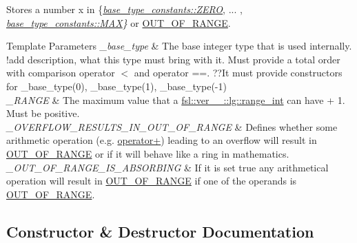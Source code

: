 Stores a number x in \{{\itshape \mbox{\hyperlink{structfsl_1_1ver__1__0_1_1lg_1_1range__int_1_1base__type__constants_ada13cd01546095bb61095888cd0ab41d}{base\+\_\+type\+\_\+constants\+::\+Z\+E\+RO}}}, ... , {\itshape \mbox{\hyperlink{structfsl_1_1ver__1__0_1_1lg_1_1range__int_1_1base__type__constants_ae6291d70cbe40dbc429eba9cc4db9d27}{base\+\_\+type\+\_\+constants\+::\+M\+AX}}\}} or \mbox{\hyperlink{classfsl_1_1ver__1__0_1_1lg_1_1range__int_a4262605b56b8b319c33b0d1ccb190a82}{O\+U\+T\+\_\+\+O\+F\+\_\+\+R\+A\+N\+GE}}. 
\begin{DoxyTemplParams}{Template Parameters}
{\em \+\_\+base\+\_\+type} & The base integer type that is used internally. !add description, what this type must bring with it. Must provide a total order with comparison operator $<$ and operator ==. ??It must provide constructors for \+\_\+base\+\_\+type(0), \+\_\+base\+\_\+type(1), \+\_\+base\+\_\+type(-\/1) \\
\hline
{\em \+\_\+\+R\+A\+N\+GE} & The maximum value that a \mbox{\hyperlink{classfsl_1_1ver__1__0_1_1lg_1_1range__int}{fsl\+::ver\+\_\+\_\+::lg\+::range\+\_\+int}} can have + 1. Must be positive. \\
\hline
{\em \+\_\+\+O\+V\+E\+R\+F\+L\+O\+W\+\_\+\+R\+E\+S\+U\+L\+T\+S\+\_\+\+I\+N\+\_\+\+O\+U\+T\+\_\+\+O\+F\+\_\+\+R\+A\+N\+GE} & Defines whether some arithmetic operation (e.\+g. \mbox{\hyperlink{classfsl_1_1ver__1__0_1_1lg_1_1range__int_a6ca845f4b8e8805cba8037d1fd9c4200}{operator+}}) leading to an overflow will result in \mbox{\hyperlink{classfsl_1_1ver__1__0_1_1lg_1_1range__int_a4262605b56b8b319c33b0d1ccb190a82}{O\+U\+T\+\_\+\+O\+F\+\_\+\+R\+A\+N\+GE}} or if it will behave like a ring in mathematics. \\
\hline
{\em \+\_\+\+O\+U\+T\+\_\+\+O\+F\+\_\+\+R\+A\+N\+G\+E\+\_\+\+I\+S\+\_\+\+A\+B\+S\+O\+R\+B\+I\+NG} & If it is set true any arithmetical operation will result in \mbox{\hyperlink{classfsl_1_1ver__1__0_1_1lg_1_1range__int_a4262605b56b8b319c33b0d1ccb190a82}{O\+U\+T\+\_\+\+O\+F\+\_\+\+R\+A\+N\+GE}} if one of the operands is \mbox{\hyperlink{classfsl_1_1ver__1__0_1_1lg_1_1range__int_a4262605b56b8b319c33b0d1ccb190a82}{O\+U\+T\+\_\+\+O\+F\+\_\+\+R\+A\+N\+GE}}. \\
\hline
\end{DoxyTemplParams}


\subsection{Constructor \& Destructor Documentation}
\mbox{\label{classfsl_1_1ver__1__0_1_1lg_1_1range__int_af2d5d7b2a049515ae1411d4a0eb6b528}} 
